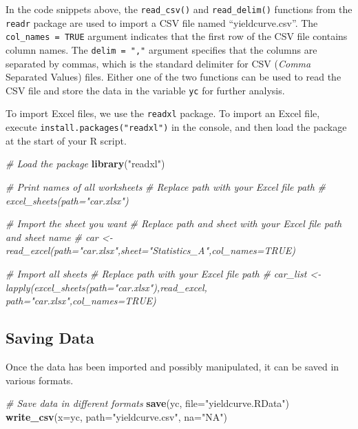 \documentclass[
]{book}
\newenvironment{Shaded}{\begin{snugshade}}{\end{snugshade}}
\newcommand{\AttributeTok}[1]{\textcolor[rgb]{0.13,0.29,0.53}{#1}}
\newcommand{\CommentTok}[1]{\textcolor[rgb]{0.56,0.35,0.01}{\textit{#1}}}
\newcommand{\FunctionTok}[1]{\textcolor[rgb]{0.13,0.29,0.53}{\textbf{#1}}}
\newcommand{\NormalTok}[1]{#1}
\newcommand{\StringTok}[1]{\textcolor[rgb]{0.31,0.60,0.02}{#1}}
\begin{document}
In the code snippets above, the \texttt{read\_csv()} and \texttt{read\_delim()} functions from the \texttt{readr} package are used to import a CSV file named ``yieldcurve.csv''. The \texttt{col\_names\ =\ TRUE} argument indicates that the first row of the CSV file contains column names. The \texttt{delim\ =\ ","} argument specifies that the columns are separated by commas, which is the standard delimiter for CSV (\emph{Comma} Separated Values) files. Either one of the two functions can be used to read the CSV file and store the data in the variable \texttt{yc} for further analysis.

To import Excel files, we use the \texttt{readxl} package. To import an Excel file, execute \texttt{install.packages("readxl")} in the console, and then load the package at the start of your R script.

\begin{Shaded}
\begin{Highlighting}[]
\CommentTok{\# Load the package}
\FunctionTok{library}\NormalTok{(}\StringTok{"readxl"}\NormalTok{)}

\CommentTok{\# Print names of all worksheets}
\CommentTok{\# Replace \textquotesingle{}path\textquotesingle{} with your Excel file path}
\CommentTok{\# excel\_sheets(path="car.xlsx")}

\CommentTok{\# Import the sheet you want}
\CommentTok{\# Replace \textquotesingle{}path\textquotesingle{} and \textquotesingle{}sheet\textquotesingle{} with your Excel file path and sheet name}
\CommentTok{\# car \textless{}{-} read\_excel(path="car.xlsx",sheet="Statistics\_A",col\_names=TRUE)}

\CommentTok{\# Import all sheets}
\CommentTok{\# Replace \textquotesingle{}path\textquotesingle{} with your Excel file path}
\CommentTok{\# car\_list \textless{}{-} lapply(excel\_sheets(path="car.xlsx"),read\_excel, path="car.xlsx",col\_names=TRUE)}
\end{Highlighting}
\end{Shaded}

\hypertarget{saving-data}{%
\subsection{Saving Data}\label{saving-data}}

Once the data has been imported and possibly manipulated, it can be saved in various formats.

\begin{Shaded}
\begin{Highlighting}[]
\CommentTok{\# Save data in different formats}
\FunctionTok{save}\NormalTok{(yc, }\AttributeTok{file=}\StringTok{"yieldcurve.RData"}\NormalTok{)}
\FunctionTok{write\_csv}\NormalTok{(}\AttributeTok{x=}\NormalTok{yc, }\AttributeTok{path=}\StringTok{"yieldcurve.csv"}\NormalTok{, }\AttributeTok{na=}\StringTok{"NA"}\NormalTok{)}
\end{Highlighting}
\end{Shaded}
\end{document}
